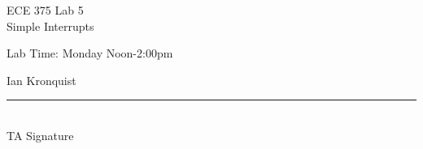 \documentclass[12pt,letterpaper]{article}
\begin{document}
\begin{titlepage}
    \vspace*{4cm}
    \begin{flushright}
    {\huge
        ECE 375 Lab 5\\[1cm]
    }
    {\large
        Simple Interrupts
    }
    \end{flushright}
    \begin{flushleft}
    Lab Time: Monday Noon-2:00pm
    \end{flushleft}
    \begin{flushright}
    Ian Kronquist
    \vfill
    \rule{5in}{.5mm}\\
    TA Signature
    \end{flushright}

\end{titlepage}
\end{document}
